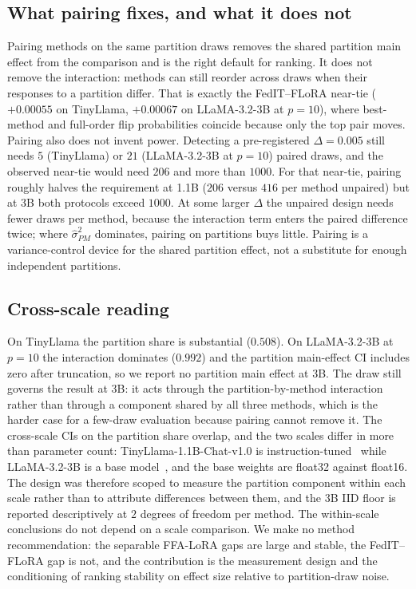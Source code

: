 \subsection{What pairing fixes, and what it does not}
Pairing methods on the same partition draws removes the shared partition main effect from the comparison and is the right default for ranking. It does not remove the interaction: methods can still reorder across draws when their responses to a partition differ. That is exactly the FedIT--FLoRA near-tie ($+0.00055$ on TinyLlama, $+0.00067$ on LLaMA-3.2-3B at $p{=}10$), where best-method and full-order flip probabilities coincide because only the top pair moves. Pairing also does not invent power. Detecting a pre-registered $\Delta{=}0.005$ still needs $5$ (TinyLlama) or $21$ (LLaMA-3.2-3B at $p{=}10$) paired draws, and the observed near-tie would need $206$ and more than $1000$. For that near-tie, pairing roughly halves the requirement at 1.1B ($206$ versus $416$ per method unpaired) but at 3B both protocols exceed $1000$. At some larger $\Delta$ the unpaired design needs fewer draws per method, because the interaction term enters the paired difference twice; where $\hat\sigma^2_{PM}$ dominates, pairing on partitions buys little. Pairing is a variance-control device for the shared partition effect, not a substitute for enough independent partitions.

\subsection{Cross-scale reading}
On TinyLlama the partition share is substantial ($0.508$). On LLaMA-3.2-3B at $p{=}10$ the
interaction dominates ($0.992$) and the partition main-effect CI includes zero after
truncation, so we report no partition main effect at 3B.
The draw still governs the result at 3B: it acts through the partition-by-method
interaction rather than through a component shared by all three methods, which is the
harder case for a few-draw evaluation because pairing cannot remove it.
The cross-scale CIs on the
partition share overlap, and the two scales differ in more than parameter count:
TinyLlama-1.1B-Chat-v1.0 is instruction-tuned~\cite{zhang2024tinyllama} while LLaMA-3.2-3B is a base model~\cite{grattafiori2024llama3}, and the
base weights are float32 against float16. The design was therefore scoped to measure the
partition component within each scale rather than to attribute differences between them,
and the 3B IID floor is reported descriptively at $2$ degrees of freedom per method. The
within-scale conclusions do not depend on a scale comparison. We make no method
recommendation: the separable FFA-LoRA gaps are large and stable, the FedIT--FLoRA gap is
not, and the contribution is the measurement design and the conditioning of ranking
stability on effect size relative to partition-draw noise.

